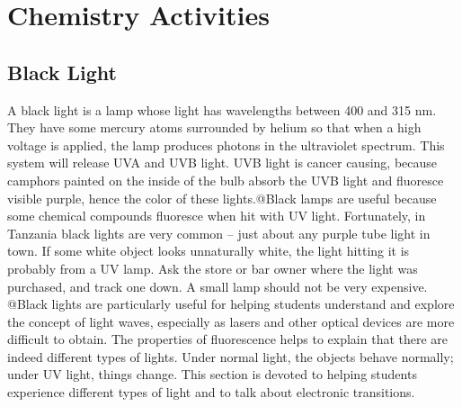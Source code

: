 \chapter{Chemistry Activities}

\section{Black Light}

A black light is a lamp whose light has wavelengths between 400 and 315 nm. They have some mercury atoms surrounded by helium so that when a high voltage is applied, the lamp produces photons in the ultraviolet spectrum. This system will release UVA and UVB light. UVB light is cancer causing, because camphors painted on the inside of the bulb absorb the UVB light and fluoresce visible purple, hence the color of these lights.@Black lamps are useful because some chemical compounds fluoresce when hit with UV light. Fortunately, in Tanzania black lights are very common – just about any purple tube light in town. If some white object looks unnaturally white, the light hitting it is probably from a UV lamp. Ask the store or bar owner where the light was purchased, and track one down. A small lamp should not be very expensive. @Black lights are particularly useful for helping students understand and explore the concept of light waves, especially as lasers and other optical devices are more difficult to obtain. The properties of fluorescence helps to explain that there are indeed different types of lights. Under normal light, the objects behave normally; under UV light, things change. This section is devoted to helping students experience different types of light and to talk about electronic transitions.

